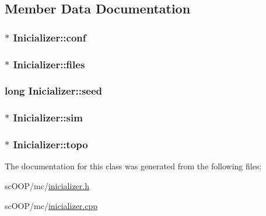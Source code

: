 \subsection{Member Data Documentation}
\hypertarget{class_inicializer_a6a3bb727f3ad6db5c667f615596cd5e4}{
\subsubsection[{conf}]{$\ast$ Inicializer\+::conf\hspace{0.3cm}{\ttfamily [private]}}}\label{class_inicializer_a6a3bb727f3ad6db5c667f615596cd5e4}
\hypertarget{class_inicializer_aecd4b4dcea44e06dd58000db4144e93e}{
\subsubsection[{files}]{$\ast$ Inicializer\+::files\hspace{0.3cm}{\ttfamily [private]}}}\label{class_inicializer_aecd4b4dcea44e06dd58000db4144e93e}
\hypertarget{class_inicializer_a98c446c361d34327e838a17737126212}{
\subsubsection[{seed}]{\setlength{\rightskip}{0pt plus 5cm}long Inicializer\+::seed\hspace{0.3cm}{\ttfamily [private]}}}\label{class_inicializer_a98c446c361d34327e838a17737126212}
\hypertarget{class_inicializer_a8d55514c1121c5d3edbbd4fdfb32db65}{
\subsubsection[{sim}]{$\ast$ Inicializer\+::sim\hspace{0.3cm}{\ttfamily [private]}}}\label{class_inicializer_a8d55514c1121c5d3edbbd4fdfb32db65}
\hypertarget{class_inicializer_a9ce346ffecd5ecf76bd4c1c68a3060f7}{
\subsubsection[{topo}]{$\ast$ Inicializer\+::topo\hspace{0.3cm}{\ttfamily [private]}}}\label{class_inicializer_a9ce346ffecd5ecf76bd4c1c68a3060f7}


The documentation for this class was generated from the following files\+:\begin{DoxyCompactItemize}
\item 
sc\+O\+O\+P/mc/\hyperlink{inicializer_8h}{inicializer.\+h}\item 
sc\+O\+O\+P/mc/\hyperlink{inicializer_8cpp}{inicializer.\+cpp}\end{DoxyCompactItemize}
